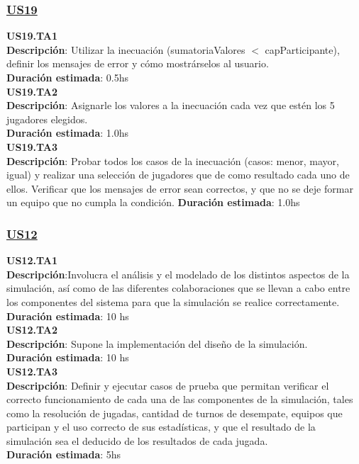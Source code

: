 \begin{tcolorbox}
\subsubsection*{\underline{US19}}
\textbf{US19.TA1} \\
\textbf{Descripción}: Utilizar la inecuación (sumatoriaValores $<$ capParticipante), definir los mensajes de error y cómo mostrárselos al usuario.\\ 
\textbf{Duración estimada}: 0.5hs \\
\newline
\textbf{US19.TA2} \\
\textbf{Descripción}: Asignarle los valores a la inecuación cada vez que estén los 5 jugadores elegidos. \\
\textbf{Duración estimada}: 1.0hs \\
\newline
\textbf{US19.TA3} \\
\textbf{Descripción}: Probar todos los casos de la inecuación (casos: menor, mayor, igual) y realizar una selección de jugadores que de como resultado cada uno de ellos. Verificar que los mensajes de error sean correctos, y que no se deje formar un equipo que no cumpla la condición.
\textbf{Duración estimada}: 1.0hs
\end{tcolorbox}
\vspace{10pt}



\begin{tcolorbox}
\subsubsection*{\underline{US12}}
\textbf{US12.TA1} \\
\textbf{Descripción}:Involucra el análisis y el modelado de los distintos aspectos de la simulación, así como de las diferentes colaboraciones que se llevan a cabo entre los componentes del sistema para que la simulación se realice correctamente.\\
\textbf{Duración estimada}: 10 hs \\
\newline
\textbf{US12.TA2} \\
\textbf{Descripción}: Supone la implementación del diseño de la simulación.\\
\textbf{Duración estimada}: 10 hs \\
\newline
\textbf{US12.TA3} \\
\textbf{Descripción}: Definir y ejecutar casos de prueba que permitan verificar el correcto funcionamiento de cada una de las componentes de la simulación, tales como la resolución de jugadas, cantidad de turnos de desempate, equipos que participan y el uso correcto de sus estadísticas, y que el resultado de la simulación sea el deducido de los resultados de cada jugada.\\
\textbf{Duración estimada}: 5hs
\end{tcolorbox}
\vspace{10pt}

